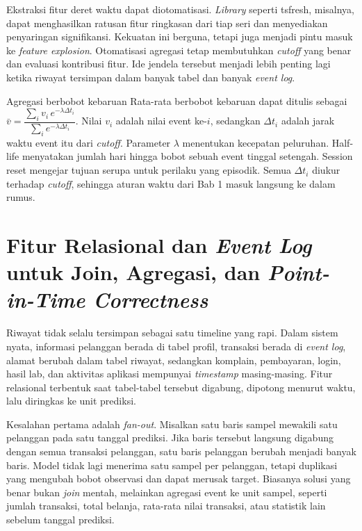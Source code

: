Ekstraksi fitur deret waktu dapat diotomatisasi. \emph{Library} seperti tsfresh, misalnya, dapat menghasilkan ratusan fitur ringkasan dari tiap seri dan menyediakan penyaringan signifikansi. Kekuatan ini berguna, tetapi juga menjadi pintu masuk ke \emph{feature explosion}. Otomatisasi agregasi tetap membutuhkan \emph{cutoff} yang benar dan evaluasi kontribusi fitur. Ide jendela tersebut menjadi lebih penting lagi ketika riwayat tersimpan dalam banyak tabel dan banyak \emph{event log}.

\begin{pendalaman}{Agregasi berbobot kebaruan}
Rata-rata berbobot kebaruan dapat ditulis sebagai \(\bar{v} = \dfrac{\sum_i v_i\, e^{-\lambda \Delta t_i}}{\sum_i e^{-\lambda \Delta t_i}}\). Nilai \(v_i\) adalah nilai event ke-\(i\), sedangkan \(\Delta t_i\) adalah jarak waktu event itu dari \emph{cutoff}. Parameter \(\lambda\) menentukan kecepatan peluruhan. Half-life menyatakan jumlah hari hingga bobot sebuah event tinggal setengah. Session reset mengejar tujuan serupa untuk perilaku yang episodik. Semua \(\Delta t_i\) diukur terhadap \emph{cutoff}, sehingga aturan waktu dari Bab 1 masuk langsung ke dalam rumus.
\end{pendalaman}

\section{\texorpdfstring{Fitur Relasional dan \emph{Event Log} untuk Join, Agregasi, dan \emph{Point-in-Time Correctness}}{Fitur Relasional dan Event Log untuk Join, Agregasi, dan Point-in-Time Correctness}}\label{fitur-relasional-dan-event-log-untuk-join-agregasi-dan-point-in-time-correctness}

Riwayat tidak selalu tersimpan sebagai satu timeline yang rapi. Dalam sistem nyata, informasi pelanggan berada di tabel profil, transaksi berada di \emph{event log}, alamat berubah dalam tabel riwayat, sedangkan komplain, pembayaran, login, hasil lab, dan aktivitas aplikasi mempunyai \emph{timestamp} masing-masing. Fitur relasional terbentuk saat tabel-tabel tersebut digabung, dipotong menurut waktu, lalu diringkas ke unit prediksi.

Kesalahan pertama adalah \emph{fan-out}. Misalkan satu baris sampel mewakili satu pelanggan pada satu tanggal prediksi. Jika baris tersebut langsung digabung dengan semua transaksi pelanggan, satu baris pelanggan berubah menjadi banyak baris. Model tidak lagi menerima satu sampel per pelanggan, tetapi duplikasi yang mengubah bobot observasi dan dapat merusak target. Biasanya solusi yang benar bukan \emph{join} mentah, melainkan agregasi event ke unit sampel, seperti jumlah transaksi, total belanja, rata-rata nilai transaksi, atau statistik lain sebelum tanggal prediksi.

